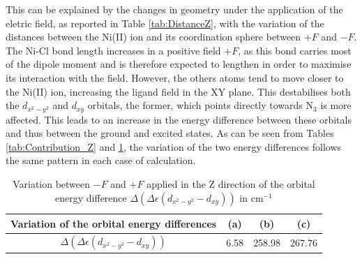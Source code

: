 \documentclass[10pt]{report}
\numberwithin{equation}{section}
\begin{document}
This can be explained by the changes in geometry under the application of the eletric field, as reported in Table \ref{tab:DistanceZ}, with the variation of the distances between the Ni(II) ion and its coordination sphere between $+F$ and $-F$.
The Ni-Cl bond length increases in a positive field $+F$, as this bond carries most of the dipole moment and is therefore expected to lengthen in order to maximise its interaction with the field. 
However, the others atoms tend to move closer to the Ni(II) ion, increasing the ligand field in the XY plane. 
This destabilises both the $d_{x^2-y^2}$ and $d_{xy}$ orbitals, the former, which points directly towards N$_3$ is more affected.
This leads to an increase in the energy difference between these orbitals and thus between the ground and excited states.
As can be seen from Tables \ref{tab:Contribution_Z} and \ref{tab:EOrbitaleZ}, the variation of the two energy differences follows the same pattern in each case of calculation.

\begin{table}[h]
    \centering
    \begin{tabular}{|c | c c c |}
        \hline
        Variation of the orbital energy differences & (a) & (b) & (c)\\
        \hline
        $\Delta(\Delta \epsilon (d_{x^2-y^2}-d_{xy}))$& 6.58 & 258.98 & 267.76\\
        \hline
    \end{tabular}
    \caption{Variation between $-F$ and $+F$ applied in the Z direction of the orbital energy difference $\Delta(\Delta \epsilon (d_{x^2-y^2}-d_{xy}))$ in cm$^{-1}$}
    \label{tab:EOrbitaleZ}
\end{table}
\end{document}
